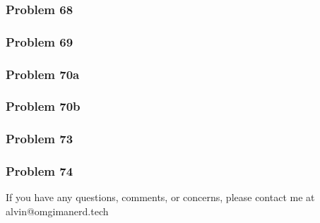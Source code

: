 \documentclass[letterpaper, 12pt]{math}
\begin{document}
\subsubsection*{Problem 68}
\subsubsection*{Problem 69}
\subsubsection*{Problem 70a}
\subsubsection*{Problem 70b}
\subsubsection*{Problem 73}
\subsubsection*{Problem 74}

\begin{center}
  If you have any questions, comments, or concerns, please contact me at
  alvin@omgimanerd.tech
\end{center}
\end{document}
